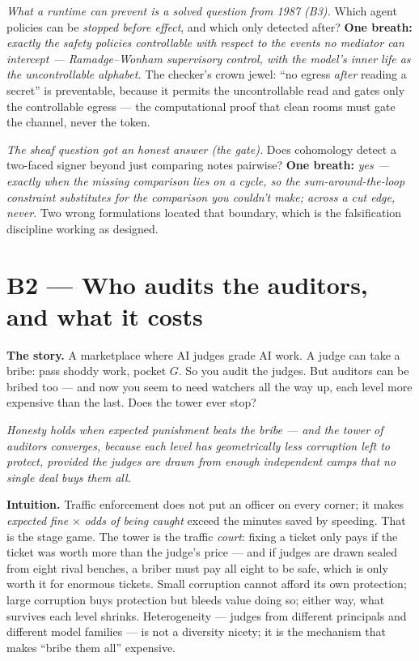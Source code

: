 \documentclass[11pt,a4paper]{article}
\newcommand{\onebreath}[1]{\begin{center}\emph{#1}\end{center}}
\begin{document}
\emph{What a runtime can prevent is a solved question from 1987 (B3).} Which agent policies can be \emph{stopped before effect}, and which only detected after? \textbf{One breath:} \emph{exactly the safety policies controllable with respect to the events no mediator can intercept --- Ramadge--Wonham supervisory control, with the model's inner life as the uncontrollable alphabet.} The checker's crown jewel: ``no egress \emph{after} reading a secret'' is preventable, because it permits the uncontrollable read and gates only the controllable egress --- the computational proof that clean rooms must gate the channel, never the token.

\emph{The sheaf question got an honest answer (the gate).} Does cohomology detect a two-faced signer beyond just comparing notes pairwise? \textbf{One breath:} \emph{yes --- exactly when the missing comparison lies on a cycle, so the sum-around-the-loop constraint substitutes for the comparison you couldn't make; across a cut edge, never.} Two wrong formulations located that boundary, which is the falsification discipline working as designed.

\section{B2 --- Who audits the auditors, and what it costs}
\textbf{The story.} A marketplace where AI judges grade AI work. A judge can take a bribe: pass shoddy work, pocket $G$. So you audit the judges. But auditors can be bribed too --- and now you seem to need watchers all the way up, each level more expensive than the last. Does the tower ever stop?

\onebreath{Honesty holds when expected punishment beats the bribe --- and the tower of auditors \emph{converges}, because each level has geometrically less corruption left to protect, provided the judges are drawn from enough independent camps that no single deal buys them all.}

\textbf{Intuition.} Traffic enforcement does not put an officer on every corner; it makes \emph{expected fine} $\times$ \emph{odds of being caught} exceed the minutes saved by speeding. That is the stage game. The tower is the traffic \emph{court}: fixing a ticket only pays if the ticket was worth more than the judge's price --- and if judges are drawn sealed from eight rival benches, a briber must pay all eight to be safe, which is only worth it for enormous tickets. Small corruption cannot afford its own protection; large corruption buys protection but bleeds value doing so; either way, what survives each level shrinks. Heterogeneity --- judges from different principals and different model families --- is not a diversity nicety; it is the mechanism that makes ``bribe them all'' expensive.
\end{document}
